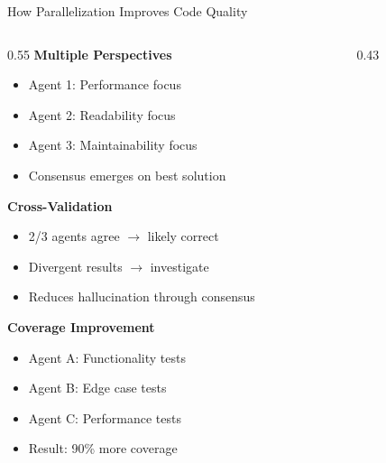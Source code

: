 \documentclass[aspectratio=169,11pt]{beamer}
\begin{document}
\begin{frame}{How Parallelization Improves Code Quality}
    \begin{columns}[T]
        \begin{column}{0.55\textwidth}
            \textbf{Multiple Perspectives}
            \begin{itemize}
                \item Agent 1: Performance focus
                \item Agent 2: Readability focus
                \item Agent 3: Maintainability focus
                \item Consensus emerges on best solution
            \end{itemize}

            \vspace{0.3cm}
            \textbf{Cross-Validation}
            \begin{itemize}
                \item 2/3 agents agree $\rightarrow$ likely correct
                \item Divergent results $\rightarrow$ investigate
                \item Reduces hallucination through consensus
            \end{itemize}

            \vspace{0.3cm}
            \textbf{Coverage Improvement}
            \begin{itemize}
                \item Agent A: Functionality tests
                \item Agent B: Edge case tests
                \item Agent C: Performance tests
                \item Result: 90\% more coverage
            \end{itemize}
        \end{column}
        \begin{column}{0.43\textwidth}
\end{column}
\end{columns}
\end{frame}
\end{document}
